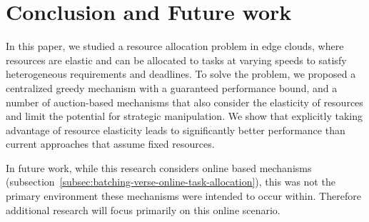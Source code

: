 \section{Conclusion and Future work}\label{sec:conclusion-and-future-work}
In this paper, we studied a resource allocation problem in edge clouds, where resources are elastic and can be
allocated to tasks at varying speeds to satisfy heterogeneous requirements and deadlines. To solve the problem,
we proposed a centralized greedy mechanism with a guaranteed performance bound, and a number of auction-based
mechanisms that also consider the elasticity of resources and limit the potential for strategic manipulation. We show
that explicitly taking advantage of resource elasticity leads to significantly better performance than current
approaches that assume fixed resources.

In future work, while this research considers online based mechanisms
(subsection~\ref{subsec:batching-verse-online-task-allocation}), this was not the primary environment these mechanisms
were intended to occur within. Therefore additional research will focus primarily on this online scenario.
